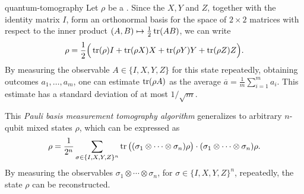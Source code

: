 \begin{example}{quantum-tomography}
    Let $\rho$ be a  . Since the  $X, Y$ and $Z$, together with the identity matrix $I$, form an orthonormal basis for the space of $2 \times 2$ matrices with respect to the inner product $(A, B) \mapsto \tfrac{1}{2} \operatorname{tr}(A B)$, we can write
    \[ \rho = \frac{1}{2} \Big( \operatorname{tr}(\rho) I + \operatorname{tr}(\rho X) X + \operatorname{tr}(\rho Y) Y + \operatorname{tr} (\rho Z) Z \Big) . \]
    By measuring the observable $A \in \{ I, X, Y, Z \}$ for this state repeatedly, obtaining outcomes $a_1, \ldots, a_m$, one can estimate $\operatorname{tr}(\rho A)$ as the average $\overline{a} = \frac{1}{m} \sum_{i = 1}^{m} a_i$. This estimate has a standard deviation of at most $1 / \sqrt{m}$.

    This \textit{Pauli basis measurement tomography algorithm} generalizes to arbitrary $n$-qubit mixed states $\rho$, which can be expressed as
    \[ \rho = \frac{1}{2^n} \sum_{\sigma \in \{ I, X, Y, Z \}^n} \operatorname{tr} \big( (\sigma_1 \otimes \cdots \otimes \sigma_n) \rho \big) \cdot (\sigma_1 \otimes \cdots \otimes \sigma_n) \rho . \]
    By measuring the observables $\sigma_1 \otimes \cdots \otimes \sigma_n$, for $\sigma \in \{ I, X, Y, Z \}^n$, repeatedly, the state $\rho$ can be reconstructed.
\end{example}
